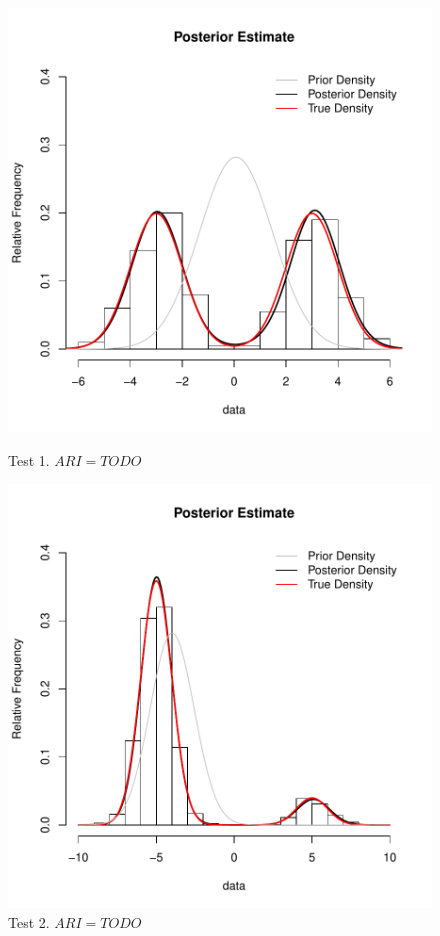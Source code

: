 \begin{figure}[h]
	\centering
	\begin{minipage}{0.5\textwidth}
		\includegraphics[scale=0.4]{etc/test1.pdf}
		\captionsetup{labelformat=empty}
		\caption{Test 1. $ARI = TODO$}
	\end{minipage}%
	\begin{minipage}{0.5\textwidth}
		\includegraphics[scale=0.4]{etc/test2.pdf}
		\captionsetup{labelformat=empty}
		\caption{Test 2. $ARI = TODO$}
	\end{minipage}
\end{figure}

